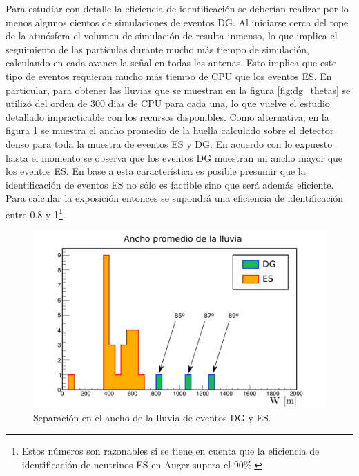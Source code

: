 	Para estudiar con detalle la eficiencia de identificaci\'on se deber\'ian realizar por lo menos algunos cientos de simulaciones de eventos DG. 
	Al iniciarse cerca del tope de la atm\'osfera el volumen de simulaci\'on de \aires{} resulta inmenso, lo que implica el seguimiento de las part\'iculas durante mucho m\'as tiempo de simulaci\'on, calculando en cada avance la se\~nal en todas las antenas.
	Esto implica que este tipo de eventos requieran mucho m\'as tiempo de CPU que los eventos ES.
	En particular, para obtener las lluvias que se muestran en la figura \ref{fig:dg_thetas} se utiliz\'o del orden de 300 dias de CPU para cada una, lo que vuelve el estudio detallado impracticable con los recursos disponibles.
	Como alternativa, en la figura \ref{fig:dg_vs_es_Idradio} se muestra el ancho promedio de la huella calculado sobre el detector denso para toda la muestra de eventos ES y DG.
	En acuerdo con lo expuesto hasta el momento se observa que los eventos DG muestran un ancho mayor que los eventos ES.
	En base a esta caracter\'istica es posible presumir que la identificaci\'on de eventos ES no s\'olo es factible sino que ser\'a adem\'as eficiente.
	Para calcular la exposici\'on entonces se supondr\'a una eficiencia de identificaci\'on entre 0.8 y 1\footnote{Estos n\'umeros son razonables si se tiene en cuenta que la eficiencia de identificaci\'on de neutrinos ES en Auger supera el 90$\%$.}.
	\begin{figure}[ht!]
		\centering
		\includegraphics[width=\textwidth]{./fig/resultadosRadio/showerWidth_Comp_DG_ES_Wt}
		\caption{\label{fig:dg_vs_es_Idradio}
		Separaci\'on en el ancho de la lluvia de eventos DG y ES. 
		}
	\end{figure}
	

